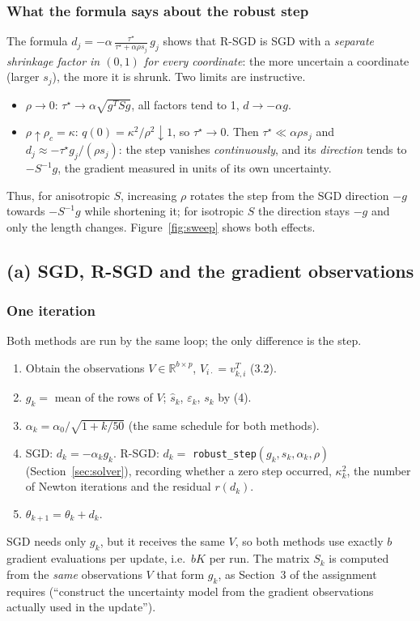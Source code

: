 \documentclass[11pt,a4paper]{article}
\begin{document}
\subsubsection*{What the formula says about the robust step}

The formula $d_j=-\alpha\,\frac{\tau^\star}{\tau^\star+\alpha\rho s_j}\,g_j$ shows
that R-SGD is SGD with a \emph{separate shrinkage factor in $(0,1)$ for every
coordinate}: the more uncertain a coordinate (larger $s_j$), the more it is shrunk.
Two limits are instructive.
\begin{itemize}
\item $\rho\to0$: $\tau^\star\to\alpha\sqrt{g^TSg}$, all factors tend to 1, $d\to-\alpha g$.
\item $\rho\uparrow\rho_c=\kappa$: $q(0)=\kappa^2/\rho^2\downarrow1$, so $\tau^\star\to0$.
Then $\tau^\star\ll\alpha\rho s_j$ and
$d_j\approx-\tau^\star g_j/(\rho s_j)$: the step vanishes \emph{continuously}, and its
\emph{direction} tends to $-S^{-1}g$, the gradient measured in units of its own
uncertainty.
\end{itemize}
Thus, for anisotropic $S$, increasing $\rho$ rotates the step from the SGD direction
$-g$ towards $-S^{-1}g$ while shortening it; for isotropic $S$ the direction stays
$-g$ and only the length changes. Figure~\ref{fig:sweep} shows both effects.

\subsection{(a) SGD, R-SGD and the gradient observations}\label{sec:oracles}

\subsubsection*{One iteration}

Both methods are run by the same loop; the only difference is the step.
\begin{enumerate}
\item Obtain the observations $V\in\mathbb R^{b\times p}$, $V_{i\cdot}=v_{k,i}^T$ (3.2).
\item $g_k=$ mean of the rows of $V$; $\widehat s_k$, $\varepsilon_k$, $s_k$ by (4).
\item $\alpha_k=\alpha_0/\sqrt{1+k/50}$ (the same schedule for both methods).
\item SGD: $d_k=-\alpha_kg_k$. R-SGD: $d_k=$ \texttt{robust\_step}$(g_k,s_k,\alpha_k,\rho)$
(Section~\ref{sec:solver}), recording whether a zero step occurred, $\kappa_k^2$, the number of Newton
iterations and the residual $r(d_k)$.
\item $\theta_{k+1}=\theta_k+d_k$.
\end{enumerate}
SGD needs only $g_k$, but it receives the same $V$, so both methods use exactly $b$
gradient evaluations per update, i.e.\ $bK$ per run. The matrix $S_k$ is computed from
the \emph{same} observations $V$ that form $g_k$, as Section~3 of the assignment requires (``construct
the uncertainty model from the gradient observations actually used in the update'').
\end{document}
